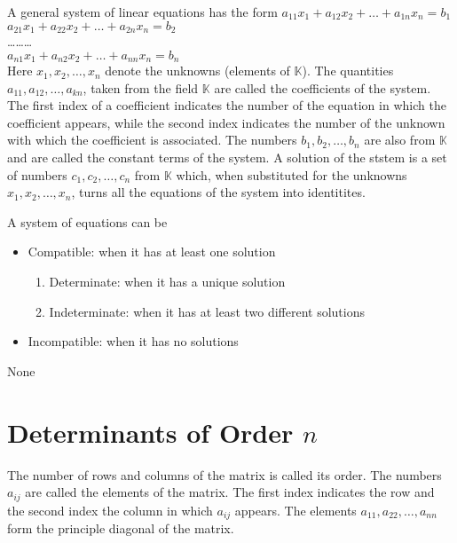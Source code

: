 \documentclass[11pt]{article} %
\newenvironment{definition}[1][Definition]{\begin{trivlist}
\item[\hskip \labelsep {\bfseries #1}]}{\end{trivlist}}
\newenvironment{assignment}[1][Assignment]{\begin{trivlist}
\item[\hskip \labelsep {\bfseries #1}]}{\end{trivlist}}
\begin{document}
\begin{definition}
	A general system of linear equations has the form
	{\center
		${a_{11}}{x_1} + {a_{12}}{x_2} + \ldots + {a_{1n}}{x_n} = b_1$ 
		\\ ${a_{21}}{x_1} + {a_{22}}{x_2} + \ldots + {a_{2n}}{x_n} = b_2$
		\\ \ldots \ldots \ldots
		\\ ${a_{n1}}{x_1} + {a_{n2}}{x_2} + \ldots + {a_{nn}}{x_n} = b_n$  
	\\	}
	Here $x_1, x_2, \ldots, x_n$ denote the unknowns (elements of $\mathbb{K}$). The quantities $a_{11}, a_{12}, \ldots, a_{kn}$, taken from the field $\mathbb{K}$ are called the coefficients of the system. The first index of a coefficient indicates the number of the equation in which the coefficient appears, while the second index indicates the number of the unknown with which the coefficient is associated. The numbers $b_1, b_2, \ldots, b_n$ are also from $\mathbb{K}$ and are called the constant terms of the system. A solution of the ststem is a set of numbers $c_1, c_2, \ldots, c_n$ from $\mathbb{K}$ which, when substituted for the unknowns $x_1, x_2, \ldots, x_n$, turns all the equations of the system into identitites. 
\end{definition}
\begin{definition}
	A system of equations can be
	\begin{itemize}
		\item Compatible: when it has at least one solution
			\begin{enumerate}
				\item Determinate: when it has a unique solution
				\item Indeterminate: when it has at least two different solutions
			\end{enumerate} 
		\item Incompatible: when it has no solutions 
	\end{itemize}
\end{definition}
\begin{assignment} None \end{assignment}

\section{Determinants of Order $n$}
\begin{definition}
	The number of rows and columns of the matrix is called its order. The numbers $a_{ij}$ are called the elements of the matrix. The first index indicates the row and the second index the column in which $a_{ij}$ appears. The elements $a_{11}, a_{22}, \ldots, a_{nn}$ form the principle diagonal of the matrix. 
\end{definition}
\end{document}
